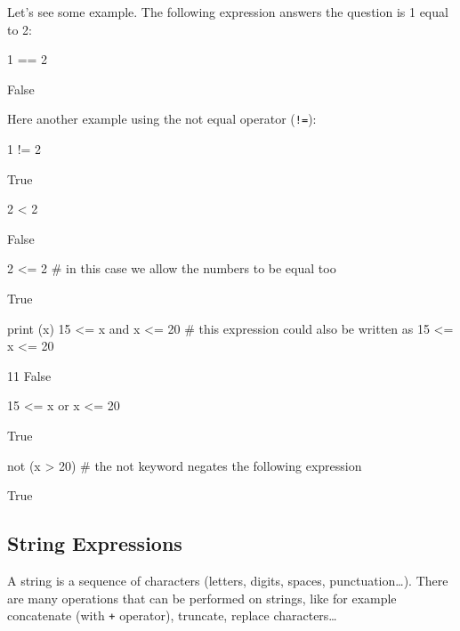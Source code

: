 Let's see some example. The following expression answers the question is 1 equal to 2:

\begin{ipythonnon}
1 == 2
\end{ipythonnon}
\begin{ioutput}
False
\end{ioutput}

Here another example using the not equal operator (\texttt{!=}):

\begin{ipythonnon}
1 != 2
\end{ipythonnon}
\begin{ioutput}
True
\end{ioutput}
\begin{ipythonnon}
2 < 2
\end{ipythonnon}
\begin{ioutput}
False
\end{ioutput}
\begin{ipythonnon}
2 <= 2 # in this case we allow the numbers to be equal too 
\end{ipythonnon}
\begin{ioutput}
True
\end{ioutput}
\begin{ipythonnon}
print (x)
15 <= x and x <= 20 # this expression could also be written as 15 <= x <= 20
\end{ipythonnon}
\begin{ioutput}
11
False
\end{ioutput}
\begin{ipythonnon}
15 <= x or x <= 20 
\end{ipythonnon}
\begin{ioutput}
True
\end{ioutput}
\begin{ipythonnon}
not (x > 20) # the not keyword negates the following expression 
\end{ipythonnon}
\begin{ioutput}
True
\end{ioutput}

\subsection{String Expressions}\label{string-expressions}

A string is a sequence of characters (letters, digits, spaces, punctuation\ldots). There are many operations that can be performed on strings, like for example concatenate (with \texttt{+} operator), truncate, replace characters\ldots

